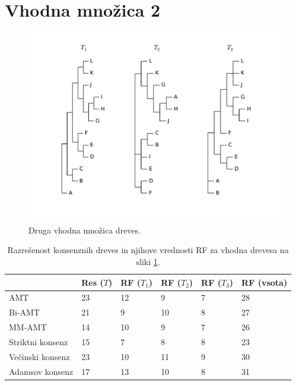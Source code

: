 \documentclass[a4paper, 12pt]{book}
\begin{document}
\section{Vhodna množica 2}
\begin{figure}[h!]
	\begin{center}
		\includegraphics[scale=0.50, clip=true, trim=1cm 2cm 1cm 0]{gfx/eval_input_2.pdf}
	\end{center}
	\caption{Druga vhodna množica dreves.}
	\label{img-eval-input-2}
\end{figure}

\begin{table}[h!]
	\begin{center}
	{\footnotesize
	\begin{tabular}{ l| l | l | l | l | l }
	~                & Res ($T$) & RF ($T_1$) & RF ($T_2$) & RF ($T_3$) & RF (vsota) \\ \hline
	AMT              & 23          & 12            & 9             & 7             & 28         \\ \hline
	Bi-AMT           & 21          & 9             & 10            & 8             & 27         \\ \hline
	MM-AMT           & 14          & 10            & 9             & 7             & 26         \\ \hline
	Striktni konsenz & 15          & 7             & 8             & 8             & 23         \\ \hline
	Večinski konsenz & 23          & 10            & 11            & 9             & 30         \\ \hline
	Adamsov konsenz  & 17          & 13            & 10            & 8             & 31         \\ \hline
	\end{tabular}
	\caption{\label{table-eval-2}Razrešenost konsenznih dreves in njihove vrednosti RF za vhodna drevesa na sliki \ref{img-eval-input-2}.}
	}
	\end{center}		
\end{table}
\end{document}
